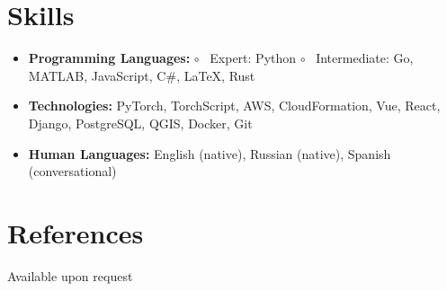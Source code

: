 \documentclass[letterpaper,11pt]{article}
\newcommand{\resumeItem}[2]{
  \item\small{
    \textbf{#1}{#2 \vspace{-2pt}}
  }
}
\newcommand{\resumeSubItem}[2]{\resumeItem{#1}{#2}\vspace{-4pt}}
\renewcommand{\labelitemii}{$\circ$}
\newcommand{\resumeSubHeadingListStart}{\begin{itemize}[leftmargin=*]}
\newcommand{\resumeSubHeadingListEnd}{\end{itemize}}
\begin{document}


\section{Skills}
 \resumeSubHeadingListStart
   \item \textbf{Programming Languages:}
   \subitem \labelitemii~ Expert: Python
   \subitem \labelitemii~ Intermediate: Go, MATLAB, JavaScript, C\#, \LaTeX, Rust
   \item \textbf{Technologies:}{ PyTorch, TorchScript, AWS, CloudFormation, Vue, React, Django, PostgreSQL, QGIS, Docker, Git}
   \item \textbf{Human Languages:}{ English (native), Russian (native), Spanish (conversational)}
 \resumeSubHeadingListEnd

\section{References}
Available upon request
\end{document}
